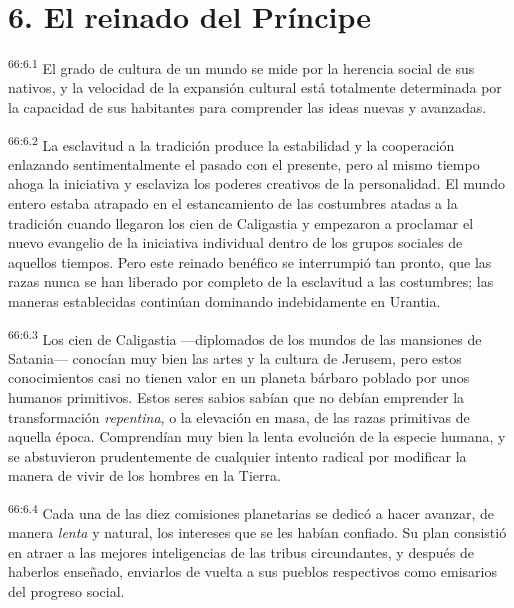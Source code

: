 \section*{6. El reinado del Príncipe}
\par
\textsuperscript{66:6.1} El grado de cultura de un mundo se mide por la herencia social de sus nativos, y la velocidad de la expansión cultural está totalmente determinada por la capacidad de sus habitantes para comprender las ideas nuevas y avanzadas.

\par
\textsuperscript{66:6.2} La esclavitud a la tradición produce la estabilidad y la cooperación enlazando sentimentalmente el pasado con el presente, pero al mismo tiempo ahoga la iniciativa y esclaviza los poderes creativos de la personalidad. El mundo entero estaba atrapado en el estancamiento de las costumbres atadas a la tradición cuando llegaron los cien de Caligastia y empezaron a proclamar el nuevo evangelio de la iniciativa individual dentro de los grupos sociales de aquellos tiempos. Pero este reinado benéfico se interrumpió tan pronto, que las razas nunca se han liberado por completo de la esclavitud a las costumbres; las maneras establecidas continúan dominando indebidamente en Urantia.

\par
\textsuperscript{66:6.3} Los cien de Caligastia ---diplomados de los mundos de las mansiones de Satania--- conocían muy bien las artes y la cultura de Jerusem, pero estos conocimientos casi no tienen valor en un planeta bárbaro poblado por unos humanos primitivos. Estos seres sabios sabían que no debían emprender la transformación \textit{repentina}, o la elevación en masa, de las razas primitivas de aquella época. Comprendían muy bien la lenta evolución de la especie humana, y se abstuvieron prudentemente de cualquier intento radical por modificar la manera de vivir de los hombres en la Tierra.

\par
\textsuperscript{66:6.4} Cada una de las diez comisiones planetarias se dedicó a hacer avanzar, de manera \textit{lenta} y natural, los intereses que se les habían confiado. Su plan consistió en atraer a las mejores inteligencias de las tribus circundantes, y después de haberlos enseñado, enviarlos de vuelta a sus pueblos respectivos como emisarios del progreso social.

